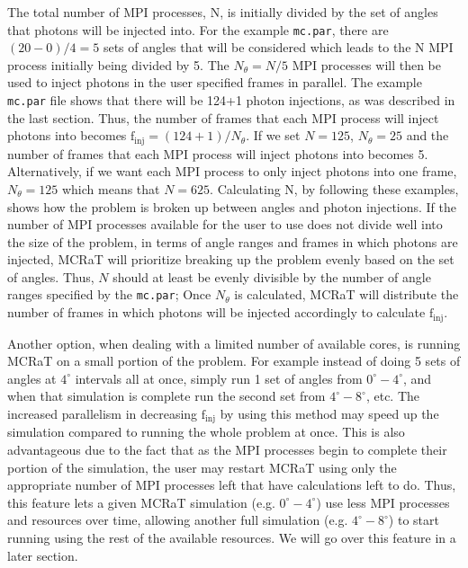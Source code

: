 \documentclass[12pt,a4paper]{article}
\begin{document}
 The total number of MPI processes, N, is initially divided by the set of angles that photons will be injected into. For the example \texttt{mc.par}, there are $(20-0)/4=5$ sets of angles that will be considered which leads to the N MPI process initially being divided by 5. The $N_\theta=N/5$ MPI processes will then be used to inject photons in the user specified frames in parallel. The example \texttt{mc.par} file shows that there will be 124+1 photon injections, as was described in the last section. Thus, the number of frames that each MPI process will inject photons into becomes $\mathrm{f_{inj}}=(124+1)/N_\theta$. If we set $N=125$, $N_\theta=25$ and the number of frames that each MPI process will inject photons into becomes 5. Alternatively, if we want each MPI process to only inject photons into one frame, $N_\theta=125$ which means that $N=625$. Calculating N, by following these examples, shows how the problem is broken up between angles and photon injections. If the number of MPI processes available for the user to use does not divide well into the size of the problem, in terms of angle ranges and frames in which photons are injected, MCRaT will prioritize breaking up the problem evenly based on the set of angles. Thus, $N$ should at least be evenly divisible by the number of angle ranges specified by the \texttt{mc.par}; Once $N_\theta$ is calculated, MCRaT will distribute the number of frames in which photons will be injected accordingly to calculate $\mathrm{f_{inj}}$.
 
 Another option, when dealing with a limited number of available cores, is running MCRaT on a small portion of the problem. For example instead of doing 5 sets of angles at $4^\circ$ intervals all at once, simply run 1 set of angles from $0^\circ-4^\circ$, and when that simulation is complete run the second set from $4^\circ-8^\circ$, etc. The increased parallelism in decreasing $\mathrm{f_{inj}}$ by using this method may speed up the simulation compared to running the whole problem at once. This is also advantageous due to the fact that as the MPI processes begin to complete their portion of the simulation, the user may restart MCRaT using only the appropriate number of MPI processes left that have calculations left to do. Thus, this feature lets a given MCRaT simulation (e.g. $0^\circ-4^\circ$) use less MPI processes and resources over time, allowing another full simulation (e.g. $4^\circ-8^\circ$) to start running using the rest of the available resources. We will go over this feature in a later section.
 
\end{document}
